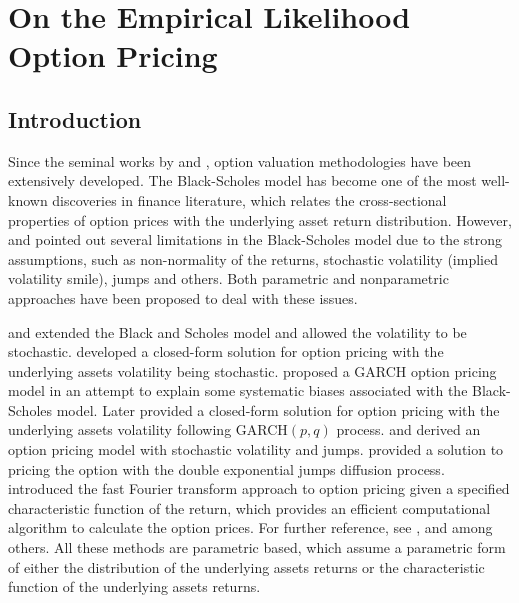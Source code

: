 \chapter{On the Empirical Likelihood Option Pricing}
\section{Introduction}
Since the seminal works by \citet{black1973pricing} and \citet{merton1973intertemporal},
option valuation methodologies have been extensively developed. The
Black-Scholes model has become one of the most well-known discoveries
in finance literature, which relates the cross-sectional properties
of option prices with the underlying asset return distribution.
However, \citet{rubinstein1985nonparametric} and \citet{melino1990pricing} pointed out
several limitations in the Black-Scholes model due to the strong assumptions,
such as non-normality of the returns, stochastic volatility (implied
volatility smile), jumps and others. Both parametric and nonparametric
approaches have been proposed to deal with these issues. 

\citet{scott1987option,hull1987pricing} and \citet{wiggins1987option} extended the
Black and Scholes model and allowed the volatility to be stochastic.
\citet{heston1993closed} developed a closed-form solution for option pricing
with the underlying assets volatility being stochastic. \citet{duan1995garch}
proposed a GARCH option pricing model in an attempt to explain some
systematic biases associated with the Black-Scholes model. Later \citet{heston2000closed} provided a closed-form solution for option pricing
with the underlying assets volatility following GARCH$(p,q)$ process.
\citet{bates1996jumps} and  \citet{bakshi1997empirical} derived an option pricing
model with stochastic volatility and jumps. \citet{kou2002jump} provided a
solution to pricing the option with the double exponential jumps diffusion
process. \citet{carr1999option} introduced the fast Fourier transform
approach to option pricing given a specified characteristic function
of the return, which provides an efficient computational algorithm
to calculate the option prices. For further reference, see \citet{duffie2000transform,bakshi2000spanning},  and \citet{carr2009saddlepoint} among
others. All these methods are parametric based, which assume a parametric
form of either the distribution of the underlying assets returns or
the characteristic function of the underlying assets returns. 

